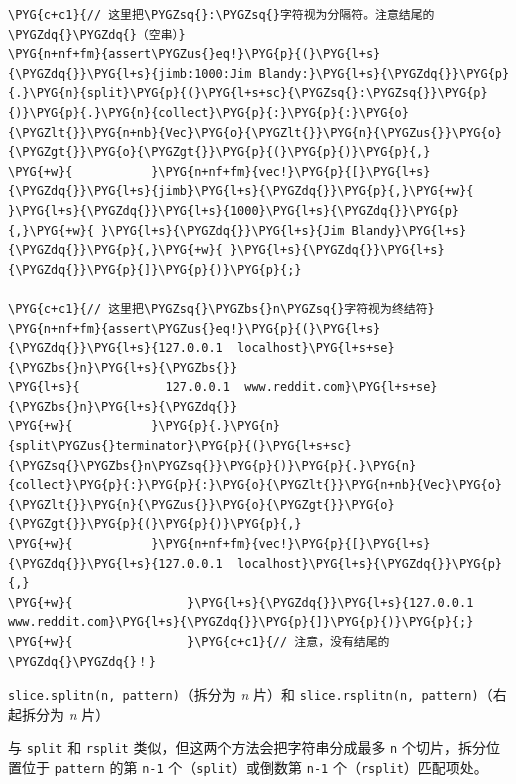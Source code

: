 \begin{Verbatim}[commandchars=\\\{\},breaklines=true,breakanywhere=true,fontsize=\codefont,xleftmargin=17bp]
\PYG{c+c1}{// 这里把\PYGZsq{}:\PYGZsq{}字符视为分隔符。注意结尾的\PYGZdq{}\PYGZdq{}（空串）}
\PYG{n+nf+fm}{assert\PYGZus{}eq!}\PYG{p}{(}\PYG{l+s}{\PYGZdq{}}\PYG{l+s}{jimb:1000:Jim Blandy:}\PYG{l+s}{\PYGZdq{}}\PYG{p}{.}\PYG{n}{split}\PYG{p}{(}\PYG{l+s+sc}{\PYGZsq{}:\PYGZsq{}}\PYG{p}{)}\PYG{p}{.}\PYG{n}{collect}\PYG{p}{:}\PYG{p}{:}\PYG{o}{\PYGZlt{}}\PYG{n+nb}{Vec}\PYG{o}{\PYGZlt{}}\PYG{n}{\PYGZus{}}\PYG{o}{\PYGZgt{}}\PYG{o}{\PYGZgt{}}\PYG{p}{(}\PYG{p}{)}\PYG{p}{,}
\PYG{+w}{           }\PYG{n+nf+fm}{vec!}\PYG{p}{[}\PYG{l+s}{\PYGZdq{}}\PYG{l+s}{jimb}\PYG{l+s}{\PYGZdq{}}\PYG{p}{,}\PYG{+w}{ }\PYG{l+s}{\PYGZdq{}}\PYG{l+s}{1000}\PYG{l+s}{\PYGZdq{}}\PYG{p}{,}\PYG{+w}{ }\PYG{l+s}{\PYGZdq{}}\PYG{l+s}{Jim Blandy}\PYG{l+s}{\PYGZdq{}}\PYG{p}{,}\PYG{+w}{ }\PYG{l+s}{\PYGZdq{}}\PYG{l+s}{\PYGZdq{}}\PYG{p}{]}\PYG{p}{)}\PYG{p}{;}

\PYG{c+c1}{// 这里把\PYGZsq{}\PYGZbs{}n\PYGZsq{}字符视为终结符}
\PYG{n+nf+fm}{assert\PYGZus{}eq!}\PYG{p}{(}\PYG{l+s}{\PYGZdq{}}\PYG{l+s}{127.0.0.1  localhost}\PYG{l+s+se}{\PYGZbs{}n}\PYG{l+s}{\PYGZbs{}}
\PYG{l+s}{            127.0.0.1  www.reddit.com}\PYG{l+s+se}{\PYGZbs{}n}\PYG{l+s}{\PYGZdq{}}
\PYG{+w}{           }\PYG{p}{.}\PYG{n}{split\PYGZus{}terminator}\PYG{p}{(}\PYG{l+s+sc}{\PYGZsq{}\PYGZbs{}n\PYGZsq{}}\PYG{p}{)}\PYG{p}{.}\PYG{n}{collect}\PYG{p}{:}\PYG{p}{:}\PYG{o}{\PYGZlt{}}\PYG{n+nb}{Vec}\PYG{o}{\PYGZlt{}}\PYG{n}{\PYGZus{}}\PYG{o}{\PYGZgt{}}\PYG{o}{\PYGZgt{}}\PYG{p}{(}\PYG{p}{)}\PYG{p}{,}
\PYG{+w}{           }\PYG{n+nf+fm}{vec!}\PYG{p}{[}\PYG{l+s}{\PYGZdq{}}\PYG{l+s}{127.0.0.1  localhost}\PYG{l+s}{\PYGZdq{}}\PYG{p}{,}
\PYG{+w}{                }\PYG{l+s}{\PYGZdq{}}\PYG{l+s}{127.0.0.1  www.reddit.com}\PYG{l+s}{\PYGZdq{}}\PYG{p}{]}\PYG{p}{)}\PYG{p}{;}
\PYG{+w}{                }\PYG{c+c1}{// 注意，没有结尾的\PYGZdq{}\PYGZdq{}！}
\end{Verbatim}

\begin{myNote}
\texttt{slice.splitn(n, pattern)}（拆分为 \emph{n} 片）和 \texttt{slice.rsplitn(n, pattern)}（右起拆分为 \emph{n} 片）
\end{myNote}

与 \texttt{split} 和 \texttt{rsplit} 类似，但这两个方法会把字符串分成最多 \texttt{n} 个切片，拆分位置位于 \texttt{pattern} 的第 \texttt{n-1} 个（\texttt{split}）或倒数第 \texttt{n-1} 个（\texttt{rsplit}）匹配项处。

